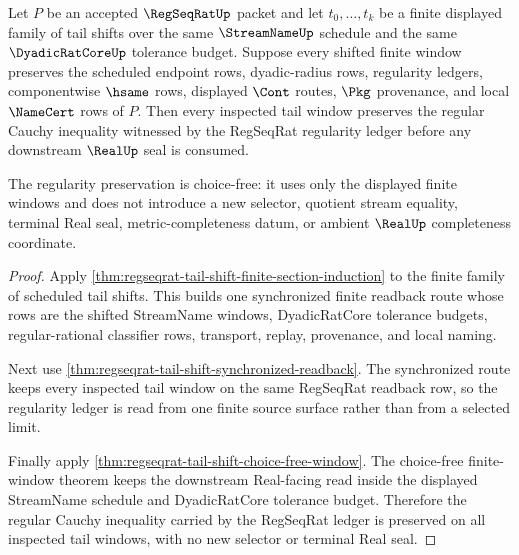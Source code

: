 \begin{theorem}
\label{thm:regseqrat-tail-shift-regularity}
Let $P$ be an accepted $\RegSeqRatUp$ packet and let $t_0,\ldots,t_k$ be a finite displayed family of tail shifts over the same $\StreamNameUp$ schedule and the same $\DyadicRatCoreUp$ tolerance budget. Suppose every shifted finite window preserves the scheduled endpoint rows, dyadic-radius rows, regularity ledgers, componentwise $\hsame$ rows, displayed $\Cont$ routes, $\Pkg$ provenance, and local $\NameCert$ rows of $P$. Then every inspected tail window preserves the regular Cauchy inequality witnessed by the RegSeqRat regularity ledger before any downstream $\RealUp$ seal is consumed.

The regularity preservation is choice-free: it uses only the displayed finite windows and does not introduce a new selector, quotient stream equality, terminal Real seal, metric-completeness datum, or ambient $\RealUp$ completeness coordinate.
\end{theorem}
\begin{proof}
Apply \autoref{thm:regseqrat-tail-shift-finite-section-induction} to the finite family of scheduled tail shifts. This builds one synchronized finite readback route whose rows are the shifted StreamName windows, DyadicRatCore tolerance budgets, regular-rational classifier rows, transport, replay, provenance, and local naming.

Next use \autoref{thm:regseqrat-tail-shift-synchronized-readback}. The synchronized route keeps every inspected tail window on the same RegSeqRat readback row, so the regularity ledger is read from one finite source surface rather than from a selected limit.

Finally apply \autoref{thm:regseqrat-tail-shift-choice-free-window}. The choice-free finite-window theorem keeps the downstream Real-facing read inside the displayed StreamName schedule and DyadicRatCore tolerance budget. Therefore the regular Cauchy inequality carried by the RegSeqRat ledger is preserved on all inspected tail windows, with no new selector or terminal Real seal.
\end{proof}

